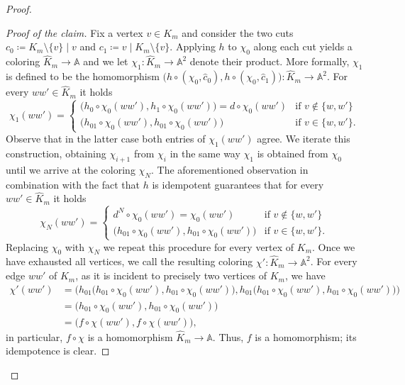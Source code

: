 \documentclass[oneside]{amsart}
\newcommand{\str}[1]{\mathbb{#1}}
\begin{document}
\begin{proof}
\begin{proof}[Proof of the claim]
Fix a vertex $v\in K_m$ and consider the two cuts $c_{0} \coloneq K_m\setminus\{v\}\mid v$ and
$c_1\coloneq  v\mid K_m\setminus\{v\}$.
Applying $h$ to $\chi_0$ along each cut yields a coloring $\hat K_m \to \str A$ and we let $\chi_1\colon \hat K_m \to \str A^2$ denote their product. More formally, $\chi_1$ is defined to be the homomorphism $\big( h \circ (\chi_0,\hat c_0), h \circ (\chi_0,\hat c_1) \big)\colon \hat K_m \to \str A^2$.
For every $w w' \in \hat K_m$ it holds
    \begin{equation*}
            \chi_1(w w') =
    \begin{cases}
    \big(h_0\circ\chi_0(w w'), h_1\circ \chi_0(w w') \big) = d\circ \chi_0(w w') &\text{if } v\notin \{w, w'\} \\ 
    \big(h_{01}\circ\chi_0(w w'), h_{01}\circ\chi_0(w w')\big) &\text{if } v\in \{w, w'\}.
    \end{cases}
    \end{equation*}
    Observe that in the latter case both entries of $\chi_1(w w')$ agree. We iterate this construction, obtaining $\chi_{i+1}$ from $\chi_i$ in the same way $\chi_1$ is obtained from $\chi_0$ until we arrive at the coloring $\chi_N$. The aforementioned observation in combination with the fact that $h$ is idempotent guarantees that for every $w w' \in \hat K_m$ it holds 
    \begin{equation*}
            \chi_N(w w') =
    \begin{cases}
    d^N \circ \chi_0(w w') = \chi_0(w w')&\text{if } v\notin \{w, w'\}\\ 
    \big(h_{01}\circ\chi_0(w w'),h_{01}\circ\chi_0(w w')\big) &\text{if } v\in \{w, w'\}.
    \end{cases} 
    \end{equation*}
    Replacing $\chi_0$ with $\chi_N$ we repeat this procedure for every vertex of 
    $K_m$.
    Once we have exhausted all vertices, we call the resulting coloring $\chi'\colon \hat K_m \to \str A^2$. For every edge $w w'$ of $K_m$, as it is incident to precisely two vertices of $K_m$, we have
    \begin{align*}
        \chi'(w w') &= \Big( h_{01}\big(h_{01}\circ \chi_0(w w'), h_{01}\circ \chi_0(w w')\big), h_{01}\big(h_{01}\circ \chi_0(w w'), h_{01}\circ \chi_0(w w')\big) \Big)\\
        &= \big( h_{01}\circ \chi_0(w w'), h_{01}\circ \chi_0(w w') \big)\\
        &= \big( f \circ \chi(w w'), f \circ \chi(w w') \big),
    \end{align*}
    in particular, $f \circ \chi$ is a homomorphism $\hat K_m \to \str A$.
    Thus, $f$ is a homomorphism; its idempotence is clear.
\end{proof}


\end{proof}
\end{document}
